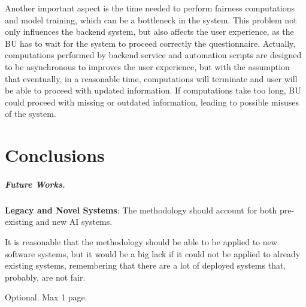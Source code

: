 \documentclass[12pt,a4paper,openright,twoside]{book}
\begin{document}
Another important aspect is the time needed to perform fairness computations and model training, which can be a bottleneck in the system.
%
This problem not only influences the backend system, but also affects the user experience, as the \ac{BU} has to wait for the system to proceed correctly the questionnaire.
%
Actually, computations performed by backend service and automation scripts are designed to be asynchronous to improves the user experience, but with the assumption that eventually, in a reasonable time, computations will terminate and user will be able to proceed with updated information.
%
If computations take too long, \ac{BU} could proceed with missing or outdated information, leading to possible misuses of the system.



\chapter{Conclusions}%
\label{chap:conclusions}

\paragraph{Future Works.}

\textbf{Legacy and Novel Systems}: The methodology should account for both pre-existing and new \ac{AI} systems.

It is reasonable that the methodology should be able to be applied to new software systems, but it would be a big lack if it could not be applied to already existing systems, remembering that there are a lot of deployed systems that, probably, are not fair.




\backmatter





\begin{acknowledgements} %
Optional. Max 1 page.
\end{acknowledgements}
\end{document}
